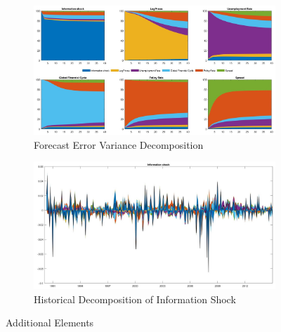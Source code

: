 \documentclass[11pt,a4paper]{article}
\begin{document}
  \begin{figure}[ht]
    \centering

    \begin{subfigure}{\textwidth}
        \includegraphics[scale=.42]{Graphs/forecast_err_variance_decomp.jpg}
        \caption{Forecast Error Variance Decomposition}
        \label{fig:fevd}
    \end{subfigure}
    
    \vspace{0.5cm} %
    
    \begin{subfigure}{\textwidth}
        \includegraphics[scale=.42]{Graphs/historical_decomp_nolegend.jpg}
        \caption{Historical Decomposition of Information Shock}
        \label{fig:hd}
    \end{subfigure}

    \caption{Additional Elements}
    \label{fig:additional_elements}
  \end{figure}
  

% 
\end{document}
